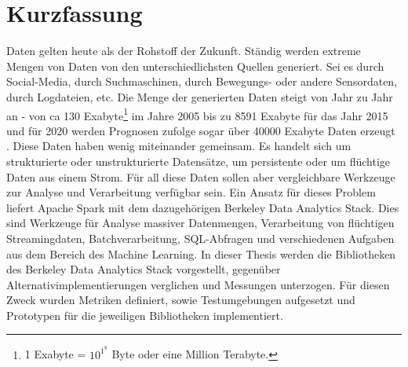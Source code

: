

\section*{Kurzfassung}

Daten gelten heute als der Rohstoff der Zukunft. Ständig werden extreme Mengen von Daten von den unterschiedlichsten Quellen generiert. Sei es durch Social-Media, durch Suchmaschinen, durch Bewegungs- oder andere Sensordaten, durch Logdateien, etc. Die Menge der generierten Daten steigt von Jahr zu Jahr an - von ca 130 Exabyte\footnote{1 Exabyte = \(10^1^8\) Byte oder eine Million Terabyte.} im Jahre 2005 bis zu 8591 Exabyte für das Jahr 2015 und für 2020 werden Prognosen zufolge sogar über 40000 Exabyte Daten erzeugt . Diese Daten haben wenig miteinander gemeinsam. Es handelt sich um strukturierte oder unstrukturierte Datensätze, um persistente oder um flüchtige Daten aus einem Strom. Für all diese Daten sollen aber vergleichbare Werkzeuge zur Analyse und Verarbeitung verfügbar sein. Ein Ansatz für dieses Problem liefert Apache Spark mit dem dazugehörigen Berkeley Data Analytics Stack. Dies sind Werkzeuge für Analyse massiver Datenmengen, Verarbeitung von flüchtigen Streamingdaten, Batchverarbeitung, SQL-Abfragen und verschiedenen Aufgaben aus dem Bereich des Machine Learning. In dieser Thesis werden die Bibliotheken des Berkeley Data Analytics Stack vorgestellt, gegenüber Alternativimplementierungen verglichen und Messungen unterzogen. Für diesen Zweck wurden Metriken definiert, sowie Testumgebungen aufgesetzt und Prototypen für die jeweiligen Bibliotheken implementiert.   


